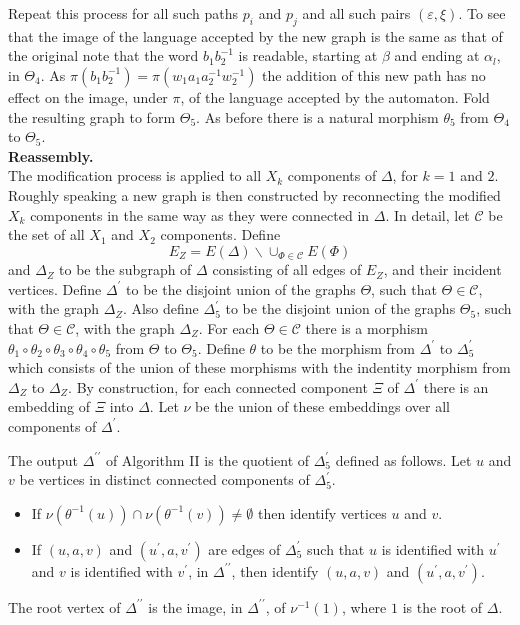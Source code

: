 \documentclass[a4paper,12pt]{article}
\renewcommand{\a}{\alpha }
\renewcommand{\b}{\beta }
\newcommand{\D}{\Delta }
\newcommand{\e}{\varepsilon }
\newcommand{\T}{\Theta }
\newcommand{\nul}{\emptyset }
\numberwithin{equation}{section}
\numberwithin{figure}{section}
\newcommand{\cC}{\mathcal{C}}
\newcommand{\bs}{\backslash}
\begin{document}
Repeat this process for all such paths $p_i$ and $p_j$ and all such
pairs $(\e,\xi)$. 
To see that the image of the language accepted by
 the new graph is the same as that of the original note
that the word $b_1b_2^{-1}$ is readable, starting at $\b$ and
ending at $\a_l$, in $\T_4$. As $\pi(b_1b_2^{-1})=\pi(w_1a_1a_2^{-1}w_2^{-1})$
the addition of this new path has no effect on the image, under $\pi$, of
the language accepted by the automaton. 
 Fold the resulting graph to form $\T_5$. As before there is a natural
morphism $\theta_5$ from $\T_4$ to $\T_5$.\\[1em]

\noindent\textbf{Reassembly.}\\
The modification process is applied to all $X_k$ components of $\D$, 
for $k=1$ and $2$. Roughly speaking a new graph is then constructed by
reconnecting the modified $X_k$ components in the same way as they
were connected in $\D$. In detail, 
let $\cC$ be the set of all
$X_1$ and $X_2$ components. 
Define 
\[E_Z=E(\D)\bs \cup_{\Phi\in \cC} E(\Phi)\]
and $\D_Z$ to be the subgraph of $\D$ consisting of all edges
of $E_Z$, and their incident vertices. 
Define $\D^\prime$ to be the disjoint union of the 
 graphs $\T$, such that $\T\in \cC$, with  the graph $\D_Z$. 
Also define $\D^{\prime}_5$ to be the disjoint union of the graphs
$\T_5$, such that $\T\in \cC$, with the graph $\D_Z$. 
For each $\T\in \cC$ there is  a morphism $\theta_1\circ\theta_2\circ\theta_3\circ\theta_4\circ\theta_5$ from $\T$ to $\T_5$. Define $\theta$ to be
the morphism from $\D^\prime$ to $\D^\prime_5$ which consists of the 
union of these morphisms with the indentity morphism from $\D_Z$ to $\D_Z$.
By construction, for each connected component $\Xi$ of $\D^\prime$ there is 
an embedding of $\Xi$ into $\D$. Let $\nu$ be the union of these 
embeddings over all components of $\D^\prime$. 

The output $\D^{\prime\prime}$  of Algorithm II is the quotient of 
 $\D^\prime_5$ defined as follows. 
Let $u$ and $v$ be vertices in
distinct connected components of $\D^\prime_5$.
\begin{itemize}
\item If $\nu(\theta^{-1}(u))\cap \nu(\theta^{-1}(v))\neq \nul$ then
identify vertices $u$ and $v$.
\item If $(u,a,v)$ and $(u^\prime, a, v^\prime)$ are edges
of $\D^\prime_5$ such that $u$ is identified with $u^\prime$ and
$v$ is identified with $v^\prime$, in $\D^{\prime\prime}$, then
identify  $(u,a,v)$ and $(u^\prime, a, v^\prime)$.
\end{itemize}  
The root vertex of $\D^{\prime\prime}$ is the image, in $\D^{\prime\prime}$, 
of $\nu^{-1}(1)$, where
$1$ is  the root of $\D$. 
\end{document}
